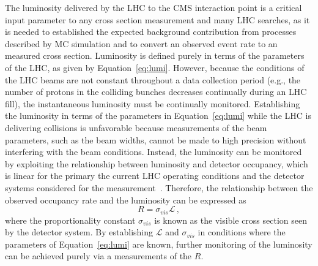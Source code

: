 The luminosity delivered by the LHC to the CMS interaction point is a critical
input parameter to any cross section measurement and many LHC searches, as it 
is needed to established the expected background contribution from processes
described by MC simulation and to convert an observed event rate to an measured
cross section. Luminosity is defined purely in terms of the parameters of the 
LHC, as given by Equation~\ref{eq:lumi}. However, because the conditions of the LHC beams
are not constant throughout a data collection period (e.g., the number of protons
in the colliding bunches decreases continually during an LHC fill),
the instantaneous luminosity must be continually monitored. Establishing
the luminosity in terms of the parameters in Equation~\ref{eq:lumi} while the LHC
is delivering collisions is unfavorable
because measurements of the beam parameters, such as the beam widths,
cannot be made to high precision without interfering with the beam conditions.
Instead, the luminosity can be monitored by exploiting the relationship between
luminosity and detector occupancy, which is linear for the primary the current
LHC operating conditions and the detector systems considered for the 
measurement~\cite{CMS-PAS-LUM-13-001}.
Therefore, the relationship between the observed occupancy 
rate and the luminosity can be expressed as
\begin{equation}
  R = \sigma_{vis}\mathcal{L}\,,
  \label{eq:lumiRate}
\end{equation}
where the proportionality constant $\sigma_{vis}$ is known as the visible cross
section seen by the detector system. By establishing $\mathcal{L}$ and $\sigma_{vis}$
in conditions where the parameters of Equation~\ref{eq:lumi} are known, further monitoring
of the luminosity can be achieved purely via a measurements of the $R$.

